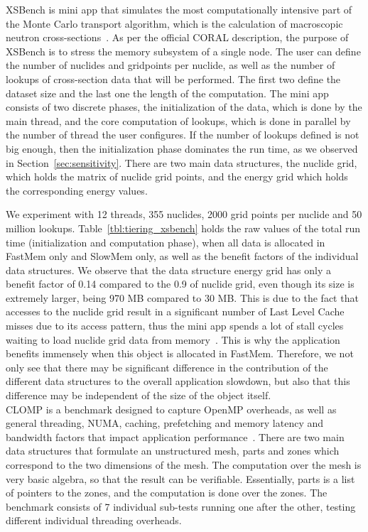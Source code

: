  XSBench is mini app that simulates the  most computationally intensive part of the Monte Carlo transport algorithm, which is the calculation of macroscopic neutron cross-sections~\cite{Tramm:wy}. As per the official CORAL description, the purpose of XSBench is to stress the memory subsystem of a single node. The user can define the number of nuclides and gridpoints per nuclide, as well as the number of lookups of cross-section data that will be performed. The first two define the dataset size and the last one the length of the computation. The mini app consists of two discrete phases, the initialization of the data, which is done by the main thread, and the core computation of lookups, which is done in parallel by the number of thread the user configures. If the number of lookups defined is not big enough, then the initialization phase dominates the run time, as we observed in Section~\ref{sec:sensitivity}.  There are two main data structures, the {\ttfamily nuclide grid},
 which holds the matrix of nuclide grid points, and the {\ttfamily energy grid} which holds the corresponding energy values. 

We experiment with 12 threads, 355 nuclides, 2000 grid points per nuclide and 50 million lookups. Table~\ref{tbl:tiering_xsbench} holds the raw values of the total run time (initialization and computation phase), when all data is allocated in FastMem only and SlowMem only, as well as the benefit factors of the individual data structures. We observe that the data structure {\ttfamily energy grid} has only a benefit factor of 0.14 compared to the 0.9 of {\ttfamily nuclide grid}, even though its size is extremely larger, being 970 MB compared to 30 MB. This is due to the fact that accesses to the {\ttfamily nuclide grid} result in a significant number of Last Level Cache misses due to its access pattern, thus the mini app spends a lot of stall cycles waiting to load {\ttfamily nuclide grid} data from memory~\cite{Pena:2016}. 
This is why the application benefits immensely when this object is allocated in FastMem. 
Therefore, we not only see that there may be significant difference in the contribution of the different data structures to the overall application slowdown, but also that this difference may be independent of the size of the object itself. \\

 CLOMP is a benchmark designed to capture OpenMP overheads, as well as general threading, NUMA, caching, prefetching and memory latency and bandwidth factors that impact application performance~\cite{Bronevetsky:2008}. There are two main data structures that formulate an unstructured mesh, {\ttfamily parts} and {\ttfamily zones} which correspond to the two dimensions of the mesh.  The computation over the mesh is very basic algebra, so that the result can be verifiable. Essentially, {\ttfamily parts} is a list of pointers to the {\ttfamily zones}, and the computation is done over the {\ttfamily zones}. The benchmark consists of 7 individual sub-tests running one after the other, testing different individual threading overheads. 

